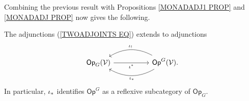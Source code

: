 \documentclass[a4paper,10pt]{article}%
\begin{document}
Combining the previous result with
Propositions \ref{MONADADJ1 PROP} and \ref{MONADADJ PROP} now gives the following.

\begin{corollary}
  The adjunctions (\ref{TWOADJOINTS EQ}) extends to  adjunctions
  \begin{equation}\label{TWOADJOINTSOP EQ}
    \begin{tikzcd}[column sep =5em]
      \mathsf{Op}_G(\mathcal{V}) \ar{r}[swap]{\iota^{\**}} 
      &
      \mathsf{Op}^G(\mathcal{V})
      \ar[bend right]{l}[swap,midway]{\iota_{!}}
      \ar[bend left]{l}{\iota_{\**}}.
    \end{tikzcd}
  \end{equation}
  In particular, $\iota_{\**}$
  identifies $\mathsf{Op}^G$ as a reflexive subcategory of 
  $\mathsf{Op}_G$.
\end{corollary}
\end{document}
